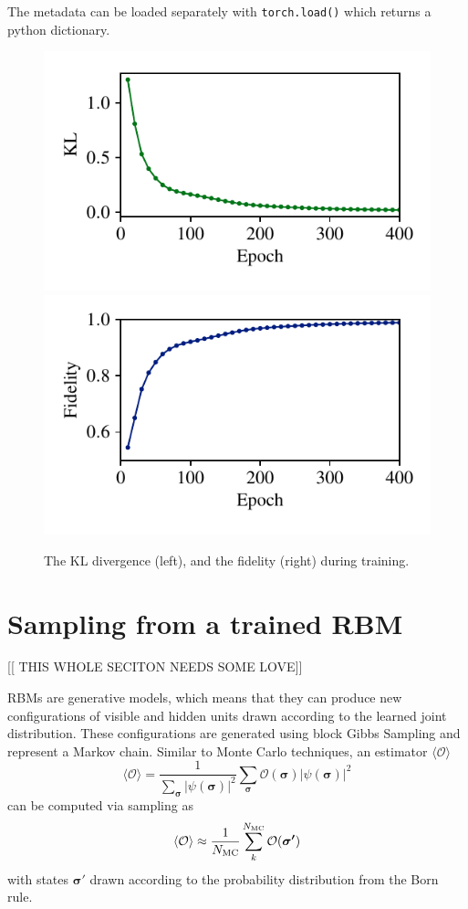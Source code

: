 \documentclass[submission, Phys]{SciPost}
\begin{document}
The metadata can be loaded separately with \verb|torch.load()| which returns a python dictionary.


\begin{figure}[]
    \centering
    \includegraphics[width=0.48\linewidth, trim={10 14 10 10}, clip]{plots/KL.pdf}
    \includegraphics[width=0.48\linewidth, trim={10 14 10 10}, clip]{plots/fid.pdf}
    \caption{The KL divergence (left), and the fidelity (right) during training.
    }
    \label{fig:KL}
\end{figure}


\section{Sampling from a trained RBM}
\label{Sec:Sampling_a-Trained_RBM}

[[ THIS WHOLE SECITON NEEDS SOME LOVE]]

RBMs are generative models, which means that they can produce new configurations of visible and hidden units
drawn according to the learned joint distribution.
These configurations are generated using block Gibbs Sampling and represent a Markov chain. Similar to Monte Carlo techniques, an estimator $\langle \mathcal{O} \rangle$ 
$$
\langle \mathcal{O} \rangle = \frac{1}{\sum_{\bm{\sigma}} |\psi(\bm{\sigma})|^2}
\sum_{\bm{\sigma}}  \mathcal{O}(\bm{\sigma}) |\psi(\bm{\sigma})|^2
$$
can be computed via sampling as 
$$
\langle \mathcal{O}\rangle \approx \frac{1}{N_{\rm MC}} \sum_k^{N_{\rm MC}}  \mathcal{O} (\bm{\sigma'})
$$
with states $ \bm{\sigma'}$ drawn according to the probability distribution from the Born rule.
\end{document}

